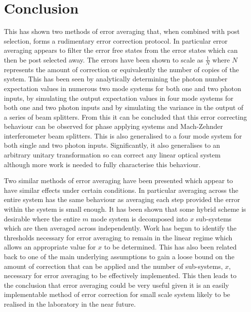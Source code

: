 \documentclass[aps,pra,twocolumn,superscriptaddress,numerical]{revtex4-1}
\begin{document}
\section{Conclusion\label{Conclusion}}
	This has shown two methods of error averaging that, when combined with post selection, forms a rudimentary error correction protocol. In particular error averaging appears to filter the error free states from the error states which can then be post selected away. The errors have been shown to scale as $\frac{1}{N}$ where $N$ represents the amount of correction or equivalently the number of copies of the system. This has been seen by analytically determining the photon number expectation values in numerous two mode systems for both one and two photon inputs, by simulating the output expectation values in four mode systems for both one and two photon inputs and by simulating the variance in the output of a series of beam splitters. From this it can be concluded that this error correcting behaviour can be observed for phase applying systems and Mach-Zehnder interferometer beam splitters. This is also generalised to a four mode system for both single and two photon inputs. Significantly, it also generalises to an arbitrary unitary transformation so can correct any linear optical system although more work is needed to fully characterise this behaviour.
	
	Two similar methods of error averaging have been presented which appear to have similar effects under certain conditions. In particular averaging across the entire system has the same behaviour as averaging each step provided the error within the system is small enough. It has been shown that some hybrid scheme is desirable where the entire $m$ mode system is decomposed into $x$ sub-systems which are then averaged across independently. Work has begun to identify the thresholds necessary for error averaging to remain in the linear regime which allows an appropriate value for $x$ to be determined. This has also been related back to one of the main underlying assumptions to gain a loose bound on the amount of correction that can be applied and the number of sub-systems, $x$, necessary for error averaging to be effectively implemented. This then leads to the conclusion that error averaging could be very useful given it is an easily implementable method of error correction for small scale system likely to be realised in the laboratory in the near future.
	
\end{document}

